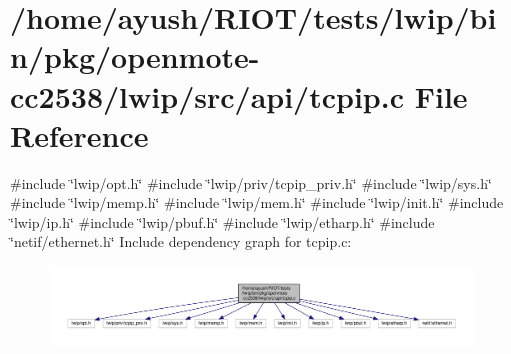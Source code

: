 \hypertarget{openmote-cc2538_2lwip_2src_2api_2tcpip_8c}{}\section{/home/ayush/\+R\+I\+O\+T/tests/lwip/bin/pkg/openmote-\/cc2538/lwip/src/api/tcpip.c File Reference}
\label{openmote-cc2538_2lwip_2src_2api_2tcpip_8c}
{\ttfamily \#include \char`\"{}lwip/opt.\+h\char`\"{}}\newline
{\ttfamily \#include \char`\"{}lwip/priv/tcpip\+\_\+priv.\+h\char`\"{}}\newline
{\ttfamily \#include \char`\"{}lwip/sys.\+h\char`\"{}}\newline
{\ttfamily \#include \char`\"{}lwip/memp.\+h\char`\"{}}\newline
{\ttfamily \#include \char`\"{}lwip/mem.\+h\char`\"{}}\newline
{\ttfamily \#include \char`\"{}lwip/init.\+h\char`\"{}}\newline
{\ttfamily \#include \char`\"{}lwip/ip.\+h\char`\"{}}\newline
{\ttfamily \#include \char`\"{}lwip/pbuf.\+h\char`\"{}}\newline
{\ttfamily \#include \char`\"{}lwip/etharp.\+h\char`\"{}}\newline
{\ttfamily \#include \char`\"{}netif/ethernet.\+h\char`\"{}}\newline
Include dependency graph for tcpip.\+c\+:
\nopagebreak
\begin{figure}[H]
\begin{center}
\leavevmode
\includegraphics[width=350pt]{openmote-cc2538_2lwip_2src_2api_2tcpip_8c__incl}
\end{center}
\end{figure}
